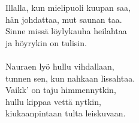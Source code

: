 
Illalla, kun mielipuoli kuupan saa, \\ hän johdattaa, mut saunan taa. \\ Sinne missä löylykauha heilahtaa  \\ ja höyrykin on tulisin. \\ \hspace{10mm} \\ Nauraen lyö hullu vihdallaan, \\ tunnen sen, kun nahkaan lissahtaa. \\ Vaikk' on taju himmennytkin, \\ hullu kippaa vettä nytkin, \\ kiukaanpintaan tulta leiskuvaan.